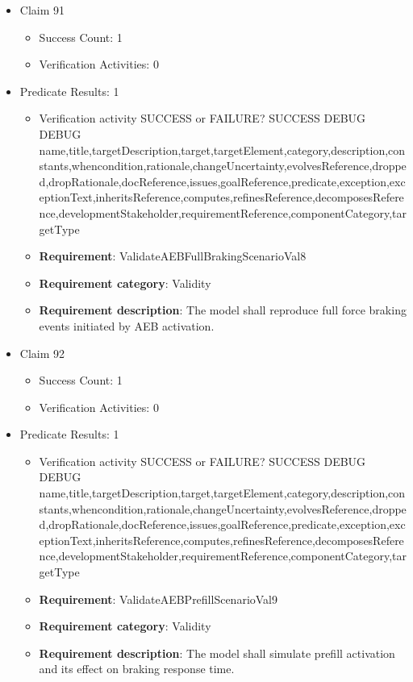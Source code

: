 \documentclass{article}
\begin{document}
\begin{itemize}
  				  \item Claim 91
				\begin{itemize}
			    	\item Success Count: 1 
			    	\item Verification Activities: 0
				\end{itemize}
				
									    
				\item Predicate Results: 1
					\begin{itemize}				
					\item Verification activity SUCCESS or FAILURE? SUCCESS
					DEBUG DEBUG name,title,targetDescription,target,targetElement,category,description,constants,whencondition,rationale,changeUncertainty,evolvesReference,dropped,dropRationale,docReference,issues,goalReference,predicate,exception,exceptionText,inheritsReference,computes,refinesReference,decomposesReference,developmentStakeholder,requirementReference,componentCategory,targetType
					\item \textbf{Requirement}: ValidateAEBFullBrakingScenarioVal8 
					\item \textbf{Requirement category}: Validity
					\item \textbf{Requirement description}: The model shall reproduce full force braking events initiated by AEB activation.
					\end{itemize}

  				  \item Claim 92
				\begin{itemize}
			    	\item Success Count: 1 
			    	\item Verification Activities: 0
				\end{itemize}
				
									    
				\item Predicate Results: 1
					\begin{itemize}				
					\item Verification activity SUCCESS or FAILURE? SUCCESS
					DEBUG DEBUG name,title,targetDescription,target,targetElement,category,description,constants,whencondition,rationale,changeUncertainty,evolvesReference,dropped,dropRationale,docReference,issues,goalReference,predicate,exception,exceptionText,inheritsReference,computes,refinesReference,decomposesReference,developmentStakeholder,requirementReference,componentCategory,targetType
					\item \textbf{Requirement}: ValidateAEBPrefillScenarioVal9 
					\item \textbf{Requirement category}: Validity
					\item \textbf{Requirement description}: The model shall simulate prefill activation and its effect on braking response time.
					\end{itemize}


\end{itemize}
\end{document}
